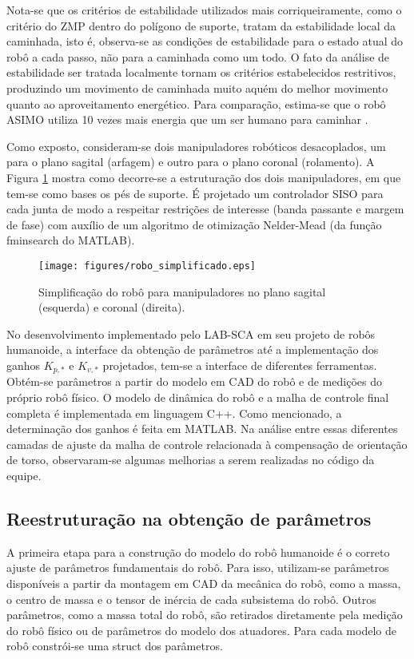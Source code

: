 Nota-se que os critérios de estabilidade utilizados mais corriqueiramente, como o critério do ZMP dentro do polígono de suporte, tratam da estabilidade local da caminhada, isto é, observa-se as condições de estabilidade para o estado atual do robô a cada passo, não para a caminhada como um todo. O fato da análise de estabilidade ser tratada localmente tornam os critérios estabelecidos restritivos, produzindo um movimento de caminhada muito aquém do melhor movimento quanto ao aproveitamento energético. Para comparação, estima-se que o robô ASIMO utiliza 10 vezes mais energia que um ser humano para caminhar \cite{tedrake2005}.

Como exposto, consideram-se dois manipuladores robóticos desacoplados, um para o plano sagital (arfagem) e outro para o plano coronal (rolamento). A Figura \ref{fig:manipuladores} mostra como decorre-se a estruturação dos dois manipuladores, em que tem-se como bases os pés de suporte. É projetado um controlador SISO para cada junta de modo a respeitar restrições de interesse (banda passante e margem de fase) com auxílio de um algoritmo de otimização Nelder-Mead (da função fminsearch do MATLAB). 

\begin{figure}
\centering
\texttt{[image: figures/robo\_simplificado.eps]}
\caption{Simplificação do robô para manipuladores no plano sagital (esquerda) e coronal (direita).}
\label{fig:manipuladores}
\end{figure}

No desenvolvimento implementado pelo LAB-SCA em seu projeto de robôs humanoide, a interface da obtenção de parâmetros até a implementação dos ganhos \( K_{p,*} \) e \( K_{v,*} \) projetados, tem-se a interface de diferentes ferramentas. Obtém-se parâmetros a partir do modelo em CAD do robô e de medições do próprio robô físico. O modelo de dinâmica do robô e a malha de controle final completa é implementada em linguagem C++. Como mencionado, a determinação dos ganhos é feita em MATLAB. Na análise entre essas diferentes camadas de ajuste da malha de controle relacionada à compensação de orientação de torso, observaram-se algumas melhorias a serem realizadas no código da equipe.

\subsection{Reestruturação na obtenção de parâmetros}

A primeira etapa para a construção do modelo do robô humanoide é o correto ajuste de parâmetros fundamentais do robô. Para isso, utilizam-se parâmetros disponíveis a partir da montagem em CAD da mecânica do robô, como a massa, o centro de massa e o tensor de inércia de cada subsistema do robô. Outros parâmetros, como a massa total do robô, são retirados diretamente pela medição do robô físico ou de parâmetros do modelo dos atuadores. Para cada modelo de robô constrói-se uma struct dos parâmetros. 

